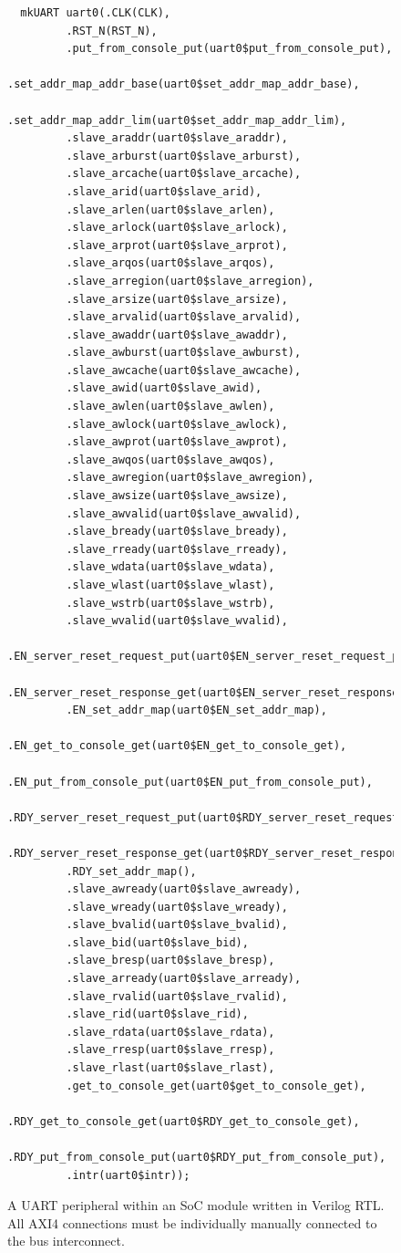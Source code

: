 \documentclass[a4paper,8pt]{report}
\begin{document}
\begin{figure}[h]
\tiny
\centering
\begin{BVerbatim}
  mkUART uart0(.CLK(CLK),
         .RST_N(RST_N),
         .put_from_console_put(uart0$put_from_console_put),
         .set_addr_map_addr_base(uart0$set_addr_map_addr_base),
         .set_addr_map_addr_lim(uart0$set_addr_map_addr_lim),
         .slave_araddr(uart0$slave_araddr),
         .slave_arburst(uart0$slave_arburst),
         .slave_arcache(uart0$slave_arcache),
         .slave_arid(uart0$slave_arid),
         .slave_arlen(uart0$slave_arlen),
         .slave_arlock(uart0$slave_arlock),
         .slave_arprot(uart0$slave_arprot),
         .slave_arqos(uart0$slave_arqos),
         .slave_arregion(uart0$slave_arregion),
         .slave_arsize(uart0$slave_arsize),
         .slave_arvalid(uart0$slave_arvalid),
         .slave_awaddr(uart0$slave_awaddr),
         .slave_awburst(uart0$slave_awburst),
         .slave_awcache(uart0$slave_awcache),
         .slave_awid(uart0$slave_awid),
         .slave_awlen(uart0$slave_awlen),
         .slave_awlock(uart0$slave_awlock),
         .slave_awprot(uart0$slave_awprot),
         .slave_awqos(uart0$slave_awqos),
         .slave_awregion(uart0$slave_awregion),
         .slave_awsize(uart0$slave_awsize),
         .slave_awvalid(uart0$slave_awvalid),
         .slave_bready(uart0$slave_bready),
         .slave_rready(uart0$slave_rready),
         .slave_wdata(uart0$slave_wdata),
         .slave_wlast(uart0$slave_wlast),
         .slave_wstrb(uart0$slave_wstrb),
         .slave_wvalid(uart0$slave_wvalid),
         .EN_server_reset_request_put(uart0$EN_server_reset_request_put),
         .EN_server_reset_response_get(uart0$EN_server_reset_response_get),
         .EN_set_addr_map(uart0$EN_set_addr_map),
         .EN_get_to_console_get(uart0$EN_get_to_console_get),
         .EN_put_from_console_put(uart0$EN_put_from_console_put),
         .RDY_server_reset_request_put(uart0$RDY_server_reset_request_put),
         .RDY_server_reset_response_get(uart0$RDY_server_reset_response_get),
         .RDY_set_addr_map(),
         .slave_awready(uart0$slave_awready),
         .slave_wready(uart0$slave_wready),
         .slave_bvalid(uart0$slave_bvalid),
         .slave_bid(uart0$slave_bid),
         .slave_bresp(uart0$slave_bresp),
         .slave_arready(uart0$slave_arready),
         .slave_rvalid(uart0$slave_rvalid),
         .slave_rid(uart0$slave_rid),
         .slave_rdata(uart0$slave_rdata),
         .slave_rresp(uart0$slave_rresp),
         .slave_rlast(uart0$slave_rlast),
         .get_to_console_get(uart0$get_to_console_get),
         .RDY_get_to_console_get(uart0$RDY_get_to_console_get),
         .RDY_put_from_console_put(uart0$RDY_put_from_console_put),
         .intr(uart0$intr));
\end{BVerbatim}
\normalsize
\caption{A UART peripheral within an SoC module written in Verilog RTL. All AXI4 connections must be
  individually manually connected to the bus interconnect.}
\label{fig:uart_wires}
\end{figure}
\end{document}
